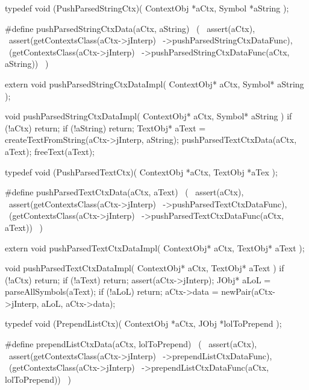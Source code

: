 \startCHeader
typedef void (PushParsedStringCtx)(
  ContextObj *aCtx,
  Symbol     *aString
);

#define pushParsedStringCtxData(aCtx, aString)      \
  (                                                 \
    assert(aCtx),                                   \
    assert(getContextsClass(aCtx->jInterp)          \
      ->pushParsedStringCtxDataFunc),               \
    (getContextsClass(aCtx->jInterp)                \
      ->pushParsedStringCtxDataFunc(aCtx, aString)) \
  )
\stopCHeader

\setCHeaderStream{private}
\startCHeader
extern void pushParsedStringCtxDataImpl(
  ContextObj* aCtx,
  Symbol* aString
);
\stopCHeader
\setCHeaderStream{public}

\startCCode
void pushParsedStringCtxDataImpl(
  ContextObj* aCtx,
  Symbol* aString
) {
  if (!aCtx) return;
  if (!aString) return;
  TextObj* aText =
    createTextFromString(aCtx->jInterp, aString);
  pushParsedTextCtxData(aCtx, aText);
  freeText(aText);
}
\stopCCode

\startCHeader
typedef void (PushParsedTextCtx)(
  ContextObj *aCtx,
  TextObj    *aTex
);

#define pushParsedTextCtxData(aCtx, aText)      \
  (                                             \
    assert(aCtx),                               \
    assert(getContextsClass(aCtx->jInterp)      \
      ->pushParsedTextCtxDataFunc),             \
    (getContextsClass(aCtx->jInterp)            \
      ->pushParsedTextCtxDataFunc(aCtx, aText)) \
  )
\stopCHeader

\startCHeader
extern void pushParsedTextCtxDataImpl(
  ContextObj* aCtx,
  TextObj* aText
);
\stopCHeader
\setCHeaderStream{public}

\startCCode
void pushParsedTextCtxDataImpl(
  ContextObj* aCtx,
  TextObj* aText
) {
  if (!aCtx) return;
  if (!aText) return;
  assert(aCtx->jInterp);
  JObj* aLoL = parseAllSymbols(aText);
  if (!aLoL) return;
  aCtx->data = newPair(aCtx->jInterp, aLoL, aCtx->data);
}
\stopCCode

\startCHeader
typedef void (PrependListCtx)(
  ContextObj *aCtx,
  JObj   *lolToPrepend
);

#define prependListCtxData(aCtx, lolToPrepend)      \
  (                                                 \
    assert(aCtx),                                   \
    assert(getContextsClass(aCtx->jInterp)          \
      ->prependListCtxDataFunc),                    \
    (getContextsClass(aCtx->jInterp)                \
      ->prependListCtxDataFunc(aCtx, lolToPrepend)) \
  )
\stopCHeader

